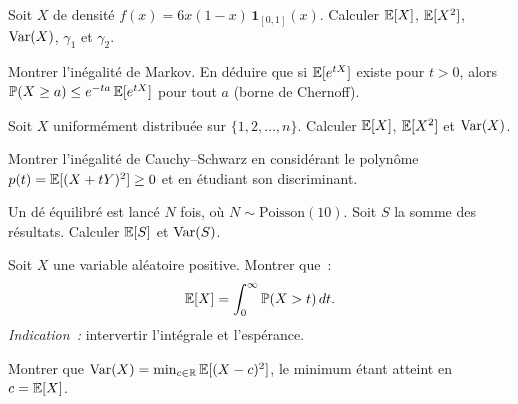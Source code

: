 \begin{exercice}
Soit $X$ de densit\'e $f(x) = 6x(1-x)\, \mathbf{1}_{[0,1]}(x)$. Calculer
$\mathbb{E}[X]$, $\mathbb{E}[X^2]$, $\mathrm{Var}(X)$, $\gamma_1$ et $\gamma_2$.
\end{exercice}

\begin{exercice}
Montrer l'in\'egalit\'e de Markov. En d\'eduire que si $\mathbb{E}[e^{tX}]$ existe pour
$t > 0$, alors $\mathbb{P}(X \geq a) \leq e^{-ta}\, \mathbb{E}[e^{tX}]$ pour tout $a$ (borne de
Chernoff).
\end{exercice}

\begin{exercice}
Soit $X$ uniform\'ement distribu\'ee sur $\{1, 2, \ldots, n\}$. Calculer $\mathbb{E}[X]$,
$\mathbb{E}[X^2]$ et $\mathrm{Var}(X)$.
\end{exercice}

\begin{exercice}
Montrer l'in\'egalit\'e de Cauchy--Schwarz en consid\'erant le polyn\^ome
$p(t) = \mathbb{E}[(X + tY)^2] \geq 0$ et en \'etudiant son discriminant.
\end{exercice}

\begin{exercice}
Un d\'e \'equilibr\'e est lanc\'e $N$ fois, o\`u $N \sim \text{Poisson}(10)$.
Soit $S$ la somme des r\'esultats. Calculer $\mathbb{E}[S]$ et $\mathrm{Var}(S)$.
\end{exercice}

\begin{exercice}
Soit $X$ une variable al\'eatoire positive. Montrer que~:
\[
    \mathbb{E}[X] = \int_0^{\infty} \mathbb{P}(X > t)\, dt.
\]
\textit{Indication~:} intervertir l'int\'egrale et l'esp\'erance.
\end{exercice}

\begin{exercice}
Montrer que $\mathrm{Var}(X) = \min_{c \in \mathbb{R}} \mathbb{E}[(X-c)^2]$, le minimum \'etant atteint
en $c = \mathbb{E}[X]$.
\end{exercice}
